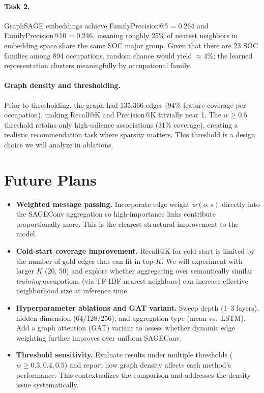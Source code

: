 \documentclass{article}
\begin{document}
\paragraph{Task 2.}
GraphSAGE embeddings achieve FamilyPrecision@5 = 0.264 and
FamilyPrecision@10 = 0.246, meaning roughly 25\% of nearest neighbors in
embedding space share the same SOC major group.
Given that there are 23 SOC families among 894 occupations, random chance
would yield $\approx 4\%$; the learned representation clusters meaningfully
by occupational family.

\paragraph{Graph density and thresholding.}
Prior to thresholding, the graph had 135,366 edges (94\% feature coverage
per occupation), making Recall@K and Precision@K trivially near 1.
The $w\!\geq\!0.5$ threshold retains only high-salience associations (31\%
coverage), creating a realistic recommendation task where sparsity matters.
This threshold is a design choice we will analyze in ablations.

\section{Future Plans}

\begin{itemize}
  \item \textbf{Weighted message passing.}
        Incorporate edge weight $w(o,s)$ directly into the SAGEConv
        aggregation so high-importance links contribute proportionally more.
        This is the clearest structural improvement to the model.

  \item \textbf{Cold-start coverage improvement.}
        Recall@K for cold-start is limited by the number of gold edges
        that can fit in top-$K$.
        We will experiment with larger $K$ (20, 50) and explore whether
        aggregating over semantically similar \emph{training} occupations
        (via TF-IDF nearest neighbors) can increase effective neighborhood
        size at inference time.

  \item \textbf{Hyperparameter ablations and GAT variant.}
        Sweep depth (1--3 layers), hidden dimension (64/128/256), and
        aggregation type (mean vs.\ LSTM).
        Add a graph attention (GAT) variant to assess whether dynamic
        edge weighting further improves over uniform SAGEConv.

  \item \textbf{Threshold sensitivity.}
        Evaluate results under multiple thresholds ($w \geq 0.3, 0.4, 0.5$)
        and report how graph density affects each method's performance.
        This contextualizes the comparison and addresses the density issue
        systematically.
\end{itemize}
\end{document}
